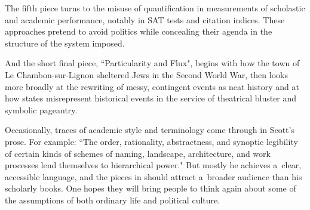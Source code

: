 \clearpage\newpage

The fifth piece turns to the misuse of quantification in measurements of scholastic and academic performance, notably in SAT tests and citation indices. These approaches pretend to avoid politics while concealing their agenda in the structure of the system imposed. 

And the short final piece, ``Particularity and Flux", begins with how the town of Le Chambon-sur-Lignon sheltered Jews in the Second World War, then looks more broadly at the rewriting of messy, contingent events as neat history and at how states misrepresent historical events in the service of theatrical bluster and symbolic pageantry. 

Occasionally, traces of academic style and terminology come through in Scott's prose. For example: ``The order, rationality, abstractness, and synoptic legibility of certain kinds of schemes of naming, landscape, architecture, and work processes lend themselves to hierarchical power." But mostly he achieves a~clear, accessible language, and the pieces in  should attract a~broader audience than his scholarly books. One hopes they will bring people to think again about some of the assumptions of both ordinary life and political culture. 

